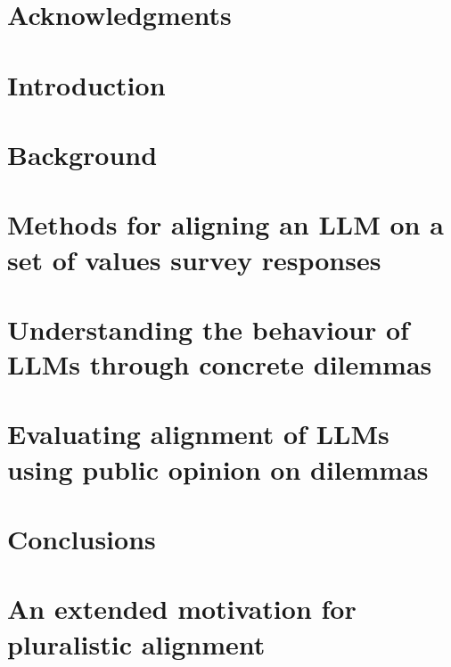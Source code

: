 \documentclass[11pt, a4paper, twoside, openright]{report}
\begin{document}
\maketitle

\chapter*{Acknowledgments}


\tableofcontents



\mainmatter

\chapter{Introduction}


\chapter{Background}
\label{chap:background}


\chapter{Methods for aligning an LLM on a set of values survey responses}
\label{chap:finetuning}


\chapter{Understanding the behaviour of LLMs through concrete dilemmas}
\label{chap:dilemmas}


\chapter{Evaluating alignment of LLMs using public opinion on dilemmas}
\label{chap:survey}


\chapter{Conclusions}
\label{chap:conclusion}



\backmatter

\printbibliography

\appendix

\chapter{An extended motivation for pluralistic alignment}
\label{app:motivation}

\end{document}
